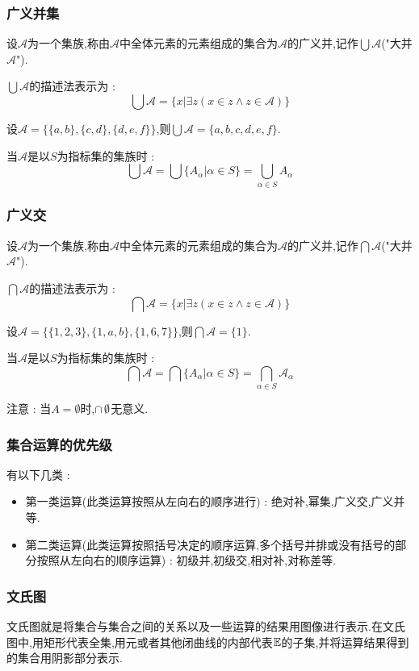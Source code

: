 {{\subsubsection{广义并集}{
  设$\mathcal{A}$为一个集族,称由$\mathcal{A}$中全体元素的元素组成的集合为$\mathcal{A}$的广义并,记作$\bigcup \mathcal{A}$("大并$\mathcal{A}$").

  $\bigcup \mathcal{A}$的描述法表示为 : $$
    \bigcup\mathcal{A} = \{x | \exists z (x \in z \land z \in \mathcal{A})\}
  $$

  设$\mathcal{A} = \{\{a,b\},\{c,d\},\{d,e,f\}\}$,则$\bigcup \mathcal{A} = \{a,b,c,d,e,f\}$.

  当$\mathcal{A}$是以$S$为指标集的集族时 : $$
    \bigcup\mathcal{A} = \bigcup\{A_\alpha | \alpha \in S\} = \bigcup_{\alpha \in S}A_\alpha
  $$
}%

\subsubsection{广义交}{
  设$\mathcal{A}$为一个集族,称由$\mathcal{A}$中全体元素的元素组成的集合为$\mathcal{A}$的广义并,记作$\bigcap \mathcal{A}$("大并$\mathcal{A}$").

  $\bigcap \mathcal{A}$的描述法表示为 : $$
    \bigcap\mathcal{A} = \{x | \exists z (x \in z \land z \in \mathcal{A})\}
  $$

  设$\mathcal{A} = \{\{1,2,3\},\{1,a,b\},\{1,6,7\}\}$,则$\bigcap \mathcal{A} = \{1\}$.

  当$\mathcal{A}$是以$S$为指标集的集族时 : $$
    \bigcap\mathcal{A} = \bigcap\{A_\alpha | \alpha \in S\} = \bigcap_{\alpha \in S}\mathcal{A}_\alpha
  $$

  注意 : 当$A = \emptyset$时,$\operatorname{\cap} \emptyset$无意义.
}%

\subsubsection{集合运算的优先级}{
  有以下几类 :

  \begin{itemize}
    \item 第一类运算(此类运算按照从左向右的顺序进行) : 绝对补,幂集,广义交,广义并等.
    \item 第二类运算(此类运算按照括号决定的顺序运算,多个括号并排或没有括号的部分按照从左向右的顺序运算) : 初级并,初级交,相对补,对称差等.
  \end{itemize}
}%

\subsubsection{文氏图}{
  文氏图就是将集合与集合之间的关系以及一些运算的结果用图像进行表示.在文氏图中,用矩形代表全集,用元或者其他闭曲线的内部代表$\operatorname{\mathbb{E}}$的子集,并将运算结果得到的集合用阴影部分表示.

}}}
